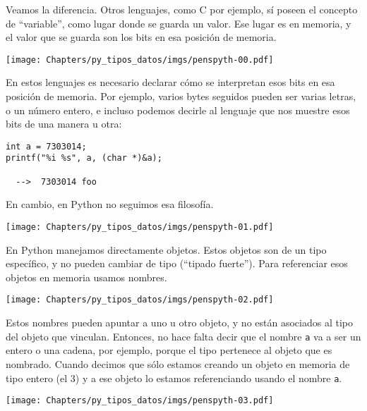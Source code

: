 Veamos la diferencia. Otros lenguajes, como C por ejemplo, sí poseen el concepto de ``variable'', como lugar donde se guarda un valor. Ese lugar es en memoria, y el valor que se guarda son los bits en esa posición de memoria.

\begin{center}
    \texttt{[image: Chapters/py\_tipos\_datos/imgs/penspyth-00.pdf]}
\end{center}

En estos lenguajes es necesario declarar cómo se interpretan esos bits en esa posición de memoria. Por ejemplo, varios bytes seguidos pueden ser varias letras, o un número entero, e incluso podemos decirle al lenguaje que nos muestre esos bits de una manera u otra:

\begin{verbatim}
int a = 7303014;
printf("%i %s", a, (char *)&a);

  -->  7303014 foo
\end{verbatim}

En cambio, en Python no seguimos esa filosofía.

\begin{center}
    \texttt{[image: Chapters/py\_tipos\_datos/imgs/penspyth-01.pdf]}
\end{center}

En Python manejamos directamente objetos. Estos objetos son de un tipo específico, y no pueden cambiar de tipo (``tipado fuerte''). Para referenciar esos objetos en memoria usamos nombres. 

\begin{center}
    \texttt{[image: Chapters/py\_tipos\_datos/imgs/penspyth-02.pdf]}
\end{center}

Estos nombres pueden apuntar a uno u otro objeto, y no están asociados al tipo del objeto que vinculan. Entonces, no hace falta decir que el nombre \verb|a| va a ser un entero o una cadena, por ejemplo, porque el tipo pertenece al objeto que es nombrado. Cuando decimos que  sólo estamos creando un objeto en memoria de tipo entero (el 3) y a ese objeto lo estamos referenciando usando el nombre \verb|a|. 

\begin{center}
    \texttt{[image: Chapters/py\_tipos\_datos/imgs/penspyth-03.pdf]}
\end{center}

